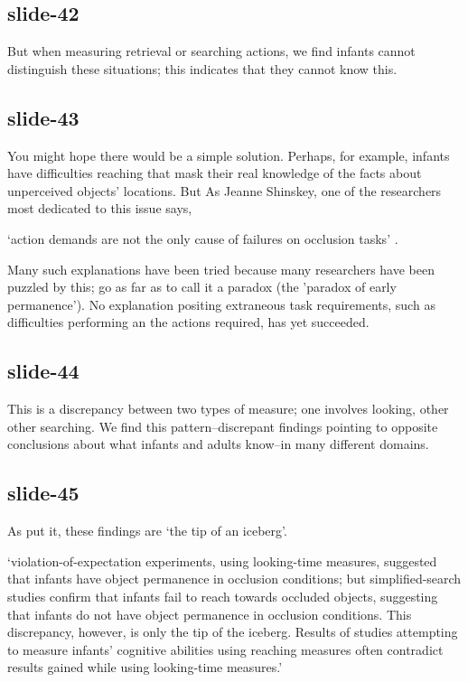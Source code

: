 \documentclass[12pt,\papersize]{extarticle}
\begin{document}
\subsection{slide-42}
But when measuring retrieval or searching actions, we find infants cannot distinguish these
situations; this indicates that they cannot know this.

\subsection{slide-43}
You might hope there would be a simple solution.  Perhaps, for example, infants have
difficulties reaching that mask their real knowledge of the facts about unperceived objects'
locations.
But As Jeanne Shinskey, one of the researchers most dedicated to this issue says,

‘action demands are not the only cause of failures on occlusion tasks’
\citep[p.\ 291]{shinskey:2012_disappearing}.

Many such explanations have been tried because many researchers have been puzzled by this;
\citet{Meltzoff:1998wp} go as far as to call it a paradox (the 'paradox of early permanence').
No explanation positing extraneous task requirements, such as difficulties performing
an the actions required, has yet succeeded.

\subsection{slide-44}
This is a discrepancy between two types of measure; one involves looking, other other
searching.
We find this pattern--discrepant findings pointing to opposite conclusions about what
infants and adults know--in many different domains.

\subsection{slide-45}
As \citet[p.\ 994]{charles:2009_object} put it, these findings are ‘the tip of an iceberg’.

‘violation-of-expectation experiments, using looking-time measures, suggested that infants
have object permanence in occlusion conditions; but simplified-search studies confirm that
infants fail to reach towards occluded objects, suggesting that infants do not have object
permanence in occlusion conditions. This discrepancy, however, is only the tip of the
iceberg. Results of studies attempting to measure infants’ cognitive abilities using reaching
measures often contradict results gained while using looking-time measures.’
\citep[p.\ 994]{charles:2009_object}
\end{document}
